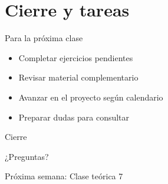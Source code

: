 \documentclass[10pt]{beamer}
\begin{document}
\section{Cierre y tareas}

\begin{frame}{Para la próxima clase}
    \begin{itemize}
        \item Completar ejercicios pendientes
        \item Revisar material complementario
        \item Avanzar en el proyecto según calendario
        \item Preparar dudas para consultar
    \end{itemize}
\end{frame}


\begin{frame}{Cierre}
    \begin{center}
        \Large{¿Preguntas?}
        
        \vspace{1cm}
        
        Próxima semana: Clase teórica 7
    \end{center}
\end{frame}
\end{document}
